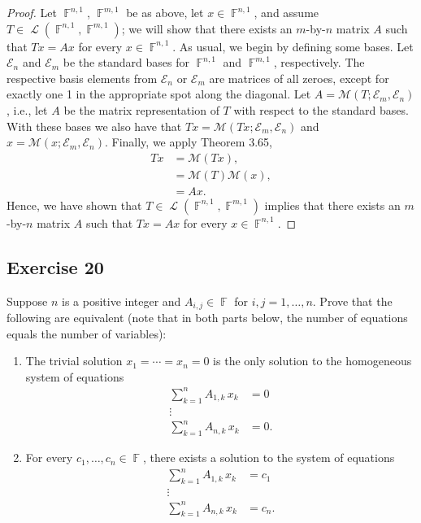 \documentclass[letterpaper, 12pt]{amsart}
\DeclareMathOperator{\F}{\mathbb{F}}				%
\DeclareMathOperator{\Ell}{\mathscr{L}}				%
\theoremstyle{definition}  							%
\begin{document}
		\begin{proof}
		Let $\F^{n,1}$, $\F^{m,1}$ be as above, let $x \in \F^{n,1}$, and assume $T \in \Ell(\F^{n,1}, \F^{m,1})$; we will show that there exists an $m$-by-$n$ matrix $A$ such that $Tx = Ax$ for every $x \in \F^{n,1}$.
		As usual, we begin by defining some bases.
		Let $\mathcal{E}_{n}$ and $\mathcal{E}_{m}$ be the standard bases for $\F^{n,1}$ and $\F^{m,1}$, respectively.
		The respective basis elements from $\mathcal{E}_{n}$ or $\mathcal{E}_{m}$ are matrices of all zeroes, except for exactly one 1 in the appropriate spot along the diagonal.
		Let $A = \mathcal{M}(T;\mathcal{E}_{m},\mathcal{E}_{n})$, i.e., let $A$ be the matrix representation of $T$ with respect to the standard bases.
		With these bases we also have that $Tx = \mathcal{M}(Tx; \mathcal{E}_{m},\mathcal{E}_{n})$ and $x = \mathcal{M}(x;\mathcal{E}_{m},\mathcal{E}_{n})$.
		Finally, we apply Theorem 3.65,
			\begin{align*}
				Tx &= \mathcal{M}(Tx), \\
				&= \mathcal{M}(T)\mathcal{M}(x), \\
				&= Ax.
			\end{align*}
		Hence, we have shown that $T \in \Ell(\F^{n,1}, \F^{m,1})$ implies that there exists an $m$-by-$n$ matrix $A$ such that $Tx = Ax$ for every $x \in \F^{n,1}$.
		\end{proof}

		\subsection*{Exercise 20}
		Suppose $n$ is a positive integer and $A_{i,j} \in \F$ for $i,j = 1, \dots, n$. 
		Prove that the following are equivalent (note that in both parts below, the number of equations equals the number of variables):
		\begin{enumerate}[\hspace{5mm} (a)]
			\item The trivial solution $x_{1} = \cdots = x_{n} = 0$ is the only solution to the homogeneous system of equations
			\begin{align*}
				\sum_{k=1}^{n} A_{1,k} \, x_{k} &= 0 \\
				\vdots & \\
				\sum_{k=1}^{n} A_{n,k} \, x_{k} &= 0.
			\end{align*}
			
			\item For every $c_{1}, \dots , c_{n} \in \F$, there exists a solution to the system of equations
			\begin{align*}
				\sum_{k=1}^{n} A_{1,k} \, x_{k} &= c_{1} \\
				\vdots & \\
				\sum_{k=1}^{n} A_{n,k} \, x_{k} &= c_{n}.
			\end{align*}
		\end{enumerate}
		
\end{document}
